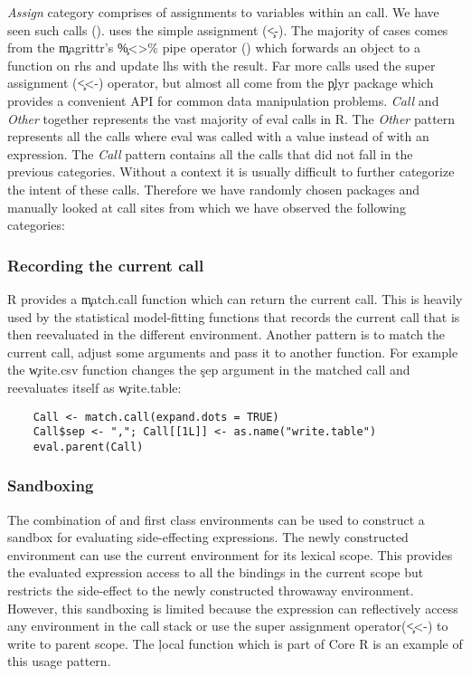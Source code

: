 \documentclass[USenglish,cleveref, autoref, thm-restate]{lipics-v2019}
\begin{document}
%
\noindent \emph{Assign} category comprises of assignments to variables
within an \eval call. We have seen \PatternAssignRnd such calls
(\PatternAssignRatio).  \PatternAssignArrowRatio uses the simple assignment
(\c{<-}). The majority of cases comes from the \c{magrittr}'s \c{\%<>\%}
pipe operator (\PatternAssignArrowMagrittrRatio) which forwards an object to
a function on rhs and update lhs with the result. Far more calls used the
super assignment (\c{<<-}) operator, but almost all come from the \c{plyr}
package which provides a convenient API for common data manipulation
problems.
%
\noindent \emph{Call} and \emph{Other} together represents the vast majority
of eval calls in R. The \emph{Other} pattern represents all the calls where
eval was called with a value instead of with an expression. The \emph{Call}
pattern contains all the calls that did not fall in the previous
categories. Without a context it is usually difficult to further categorize
the intent of these calls.  Therefore we have randomly chosen
\PatternManualPackages packages and manually looked at
\PatternManualCallsites call sites from which we have observed the following
categories:

\subsubsection{Recording the current call} R provides a \c{match.call} function
which can return the current call. This is heavily used by the statistical
model-fitting functions that records the current call that is then
reevaluated in the different environment. Another pattern is to match the
current call, adjust some arguments and pass it to another function. For
example the \c{write.csv} function changes the \c{sep} argument in the
matched call and reevaluates itself as \c{write.table}:
%
\begin{lstlisting}
    Call <- match.call(expand.dots = TRUE)
    Call$sep <- ","; Call[[1L]] <- as.name("write.table")
    eval.parent(Call)
\end{lstlisting}

\subsubsection{Sandboxing} The combination of \eval and first class
environments can be used to construct a sandbox for evaluating
side-effecting expressions. The newly constructed environment can use the
current environment for its lexical scope. This provides the evaluated
expression access to all the bindings in the current scope but restricts the
side-effect to the newly constructed throwaway environment. However, this
sandboxing is limited because the expression can reflectively access any
environment in the call stack or use the super assignment operator(\c{<<-})
to write to parent scope. The \c{local} function which is part of Core R is
an example of this usage pattern.
\end{document}
